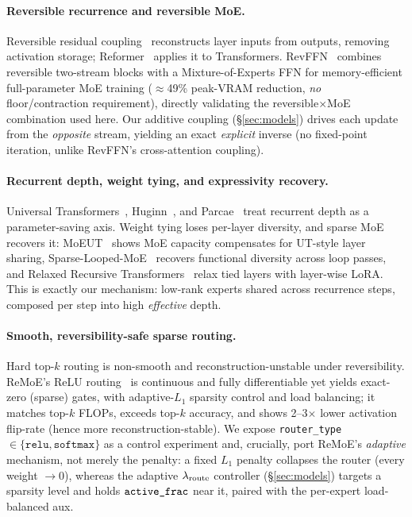 \documentclass[11pt]{article}
\newcommand{\code}[1]{\texttt{#1}}
\begin{document}
\paragraph{Reversible recurrence and reversible MoE.}
Reversible residual coupling~\cite{revnet} reconstructs layer inputs from outputs, removing
activation storage; Reformer~\cite{reformer} applies it to Transformers. RevFFN~\cite{revffn}
combines reversible two-stream blocks with a Mixture-of-Experts FFN for memory-efficient
full-parameter MoE training (\(\approx\)49\% peak-VRAM reduction, \emph{no} floor/contraction
requirement), directly validating the reversible\(\times\)MoE combination used here. Our
additive coupling (\S\ref{sec:models}) drives each update from the \emph{opposite} stream,
yielding an exact \emph{explicit} inverse (no fixed-point iteration, unlike RevFFN's
cross-attention coupling).

\paragraph{Recurrent depth, weight tying, and expressivity recovery.}
Universal Transformers~\cite{ut}, Huginn~\cite{huginn}, and Parcae~\cite{parcae} treat
recurrent depth as a parameter-saving axis. Weight tying loses per-layer diversity, and sparse
MoE recovers it: MoEUT~\cite{moeut} shows MoE capacity compensates for UT-style layer sharing,
Sparse-Looped-MoE~\cite{sparseloopedmoe} recovers functional diversity across loop passes, and
Relaxed Recursive Transformers~\cite{relaxedrec} relax tied layers with layer-wise LoRA. This
is exactly our mechanism: low-rank experts shared across recurrence steps, composed per step
into high \emph{effective} depth.

\paragraph{Smooth, reversibility-safe sparse routing.}
Hard top-\(k\) routing is non-smooth and reconstruction-unstable under reversibility. ReMoE's
ReLU routing~\cite{remoe} is continuous and fully differentiable yet yields exact-zero (sparse)
gates, with adaptive-\(L_1\) sparsity control and load balancing; it matches top-\(k\) FLOPs,
exceeds top-\(k\) accuracy, and shows 2--3\(\times\) lower activation flip-rate (hence more
reconstruction-stable). We expose \texttt{router\_type}\(\in\{\texttt{relu},\texttt{softmax}\}\)
as a control experiment and, crucially, port ReMoE's \emph{adaptive} mechanism, not merely the
penalty: a fixed \(L_1\) penalty collapses the router (every weight \(\to0\)), whereas the
adaptive \(\lambda_{\rm route}\) controller (\S\ref{sec:models}) targets a sparsity level and
holds \(\code{\detokenize{active_frac}}\) near it, paired with the per-expert load-balanced aux.
\end{document}

